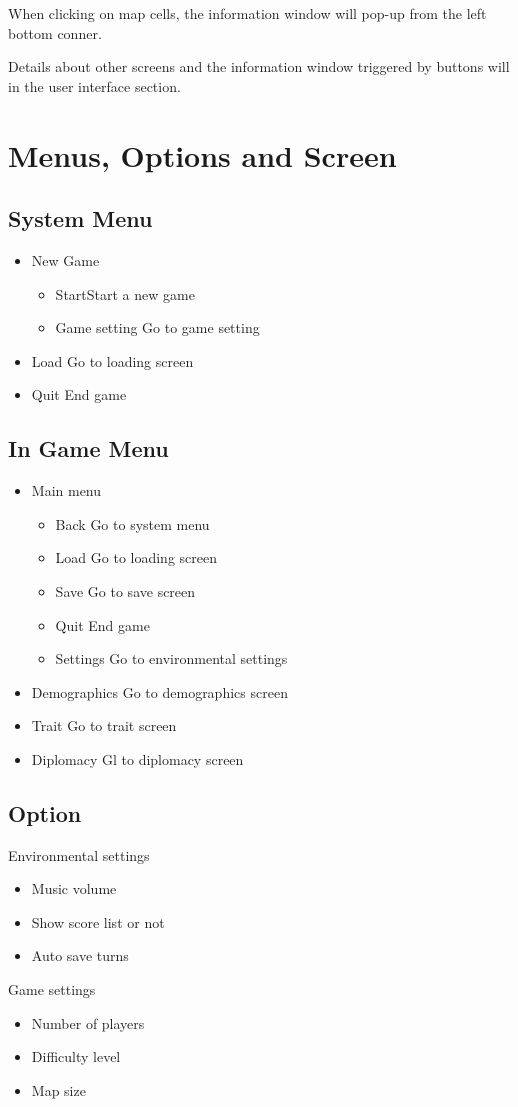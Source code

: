 \documentclass[12pt,a4paper]{article}
\begin{document}
When clicking on map cells, the information window will pop-up from the left bottom conner.

Details about other screens and the information window triggered by buttons will in the user interface section.


\section{Menus, Options and Screen}
\subsection{System Menu}
\begin{itemize}
\item New Game
\begin{itemize}
\item Start\hfill Start a new game
\item Game setting \hfill Go to game setting
\end{itemize}
\item Load \hfill Go to loading screen
\item Quit \hfill End game
\end{itemize}
\subsection{In Game Menu}
\begin{itemize}
\item Main menu 
\begin{itemize}
\item Back \hfill Go to system menu
\item Load \hfill Go to loading screen
\item Save \hfill Go to save screen
\item Quit \hfill End game
\item Settings \hfill Go to environmental settings
\end{itemize}
\item Demographics \hfill Go to demographics screen
\item Trait \hfill Go to trait screen
\item Diplomacy \hfill Gl to diplomacy screen
\end{itemize}
\subsection{Option}
Environmental settings
\begin{itemize}
\item Music volume
\item Show score list or not
\item Auto save \hfill turns
\end{itemize}
Game settings
\begin{itemize}
\item Number of players
\item Difficulty level
\item Map size
\end{itemize}
\end{document}
